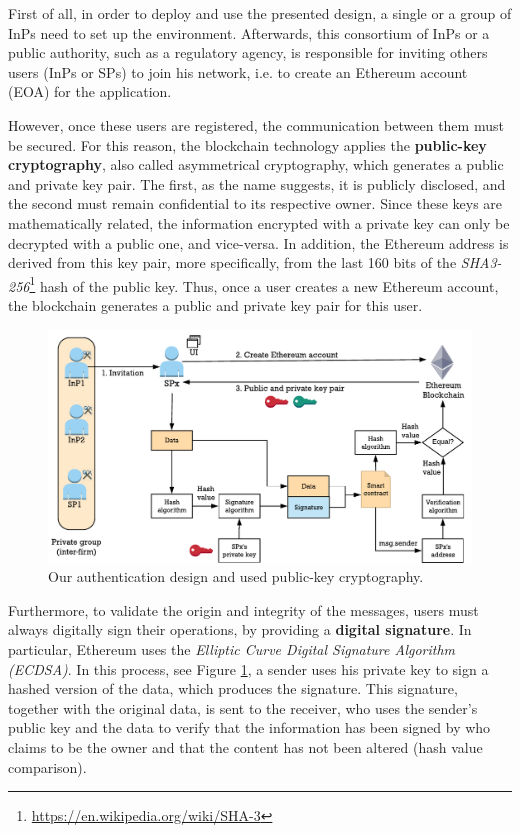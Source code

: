 First of all, in order to deploy and use the presented design, a single or a group of InPs need to set up the environment. Afterwards, this consortium of InPs or a public authority, such as a regulatory agency, is responsible for inviting others users (InPs or SPs) to join his network, i.e. to create an Ethereum account (EOA) for the application. 

However, once these users are registered, the communication between them must be secured. For this reason, the blockchain technology applies the \textbf{public-key cryptography}, also called asymmetrical cryptography, which generates a public and private key pair. The first, as the name suggests, it is publicly disclosed, and the second must remain confidential to its respective owner. Since these keys are mathematically related, the information encrypted with a private key can only be decrypted with a public one, and vice-versa. In addition, the Ethereum address is derived from this key pair, more specifically, from the last 160 bits of the \textit{SHA3-256}\footnote{\url{https://en.wikipedia.org/wiki/SHA-3}} hash of the public key. Thus, once a user creates a new Ethereum account, the blockchain generates a public and private key pair for this user.

\begin{figure}[bth]
	\centering
	\includegraphics[scale=0.85]{gfx/authentication_design}    
  	\caption{Our authentication design and used public-key cryptography.}
  	\label{fig:authenticationDesign}
\end{figure}

Furthermore, to validate the origin and integrity of the messages, users must always digitally sign their operations, by providing a \textbf{digital signature}. In particular, Ethereum uses the \textit{Elliptic Curve Digital Signature Algorithm (ECDSA)}. In this process, see Figure \ref{fig:authenticationDesign}, a sender uses his private key to sign a hashed version of the data, which produces the signature. This signature, together with the original data, is sent to the receiver, who uses the sender's public key and the data to verify that the information has been signed by who claims to be the owner and that the content has not been altered (hash value comparison).

